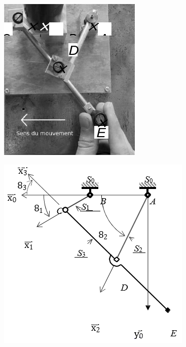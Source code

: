 \begin{minipage}{0.45\linewidth}
 \includegraphics[width=0.8\linewidth]{img/Figure4}
\end{minipage}\hfill
\begin{minipage}{0.45\linewidth}
 \includegraphics[width=0.8\linewidth]{img/Figure5}
\end{minipage}

